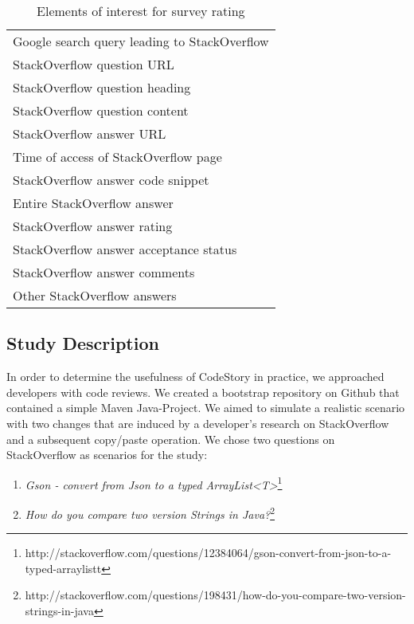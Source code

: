 \documentclass[../manifest.tex]{subfiles}
\begin{document}
\begin{table*}[t]
    \label{tab:elements-of-interest}
    \begin{tabular*}{\textwidth}{l}
    \hline
    Google search query leading to StackOverflow \\
    StackOverflow question URL \\
    StackOverflow question heading \\
    StackOverflow question content \\
    StackOverflow answer URL \\
    Time of access of StackOverflow page \\
    StackOverflow answer code snippet \\
    Entire StackOverflow answer \\
    StackOverflow answer rating \\
    StackOverflow answer acceptance status \\
    StackOverflow answer comments \\
    Other StackOverflow answers \\
    \hline
    \end{tabular*}
    \caption{Elements of interest for survey rating}
\end{table*}

\subsection{Study Description} \label{eval-description}

In order to determine the usefulness of CodeStory in practice, we approached developers with code reviews. We created a bootstrap repository on Github that contained a simple Maven Java-Project. We aimed to simulate a realistic scenario with two changes that are induced by a developer's research on StackOverflow and a subsequent copy/paste operation. We chose two questions on StackOverflow as scenarios for the study:
\begin{enumerate}
  \item \textit{Gson - convert from Json to a typed ArrayList<T>}\footnote{http://stackoverflow.com/questions/12384064/gson-convert-from-json-to-a-typed-arraylistt}
  \item \textit{How do you compare two version Strings in Java?}\footnote{http://stackoverflow.com/questions/198431/how-do-you-compare-two-version-strings-in-java}
\end{enumerate}
\end{document}
